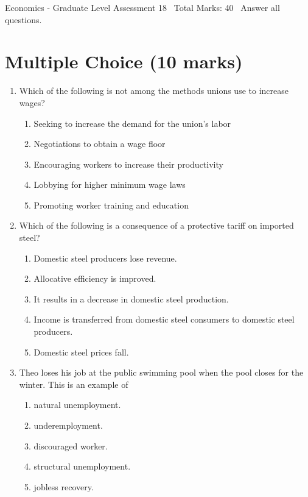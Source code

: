 \documentclass[12pt]{article}
\begin{document}
\begin{center}
Economics - Graduate Level Assessment 18 \
Total Marks: 40 \
Answer all questions.
\end{center}

\section*{Multiple Choice (10 marks)}
\begin{enumerate}[label=\arabic*.]
\item Which of the following is not among the methods unions use to increase wages?
\begin{enumerate}[label=(\alph*)]
    \item Seeking to increase the demand for the union's labor
    \item Negotiations to obtain a wage floor
    \item Encouraging workers to increase their productivity
    \item Lobbying for higher minimum wage laws
    \item Promoting worker training and education
\end{enumerate}
\item Which of the following is a consequence of a protective tariff on imported steel?
\begin{enumerate}[label=(\alph*)]
    \item Domestic steel producers lose revenue.
    \item Allocative efficiency is improved.
    \item It results in a decrease in domestic steel production.
    \item Income is transferred from domestic steel consumers to domestic steel producers.
    \item Domestic steel prices fall.
\end{enumerate}
\item Theo loses his job at the public swimming pool when the pool closes for the winter. This is an example of
\begin{enumerate}[label=(\alph*)]
    \item natural unemployment.
    \item underemployment.
    \item discouraged worker.
    \item structural unemployment.
    \item jobless recovery.
\end{enumerate}

\end{enumerate}
\end{document}

